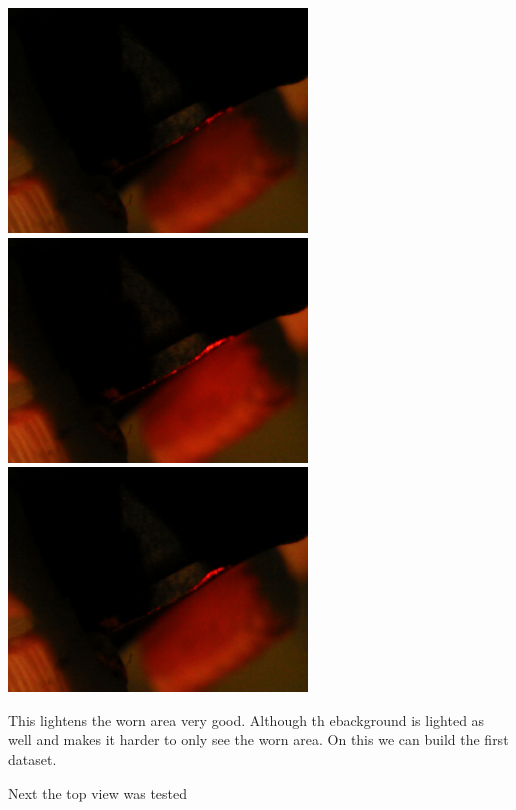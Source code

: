 \documentclass{article}
\begin{document}
\includegraphics[width=3.125000in, keepaspectratio=true]{./ZimFiles_files/Vision/Dataset/automated_datasets/1_check_camera_position/1_camera_position_side/p3_l8.png}\includegraphics[width=3.125000in, keepaspectratio=true]{./ZimFiles_files/Vision/Dataset/automated_datasets/1_check_camera_position/1_camera_position_side/p3_l9.png}\includegraphics[width=3.125000in, keepaspectratio=true]{./ZimFiles_files/Vision/Dataset/automated_datasets/1_check_camera_position/1_camera_position_side/p3_l10.png}



This lightens the worn area very good. Although th ebackground is lighted as well and makes it harder to only see the worn area. On this we can build the first dataset. 

Next the top view was tested 
\end{document}
